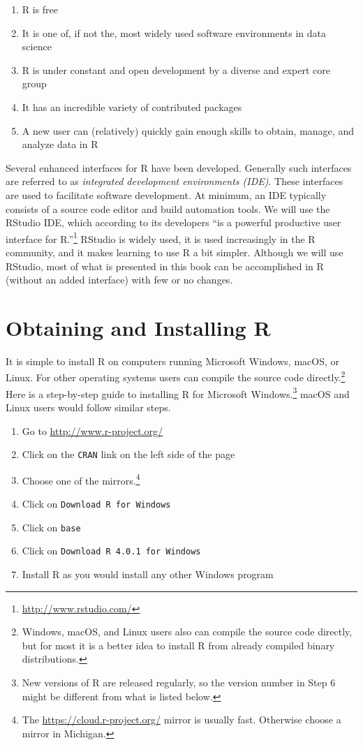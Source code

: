 \documentclass[
]{krantz}
\providecommand{\tightlist}{%
  \setlength{\itemsep}{0pt}\setlength{\parskip}{0pt}}
\begin{document}
\begin{enumerate}
\def\labelenumi{\arabic{enumi}.}
\tightlist
\item
  R is free
\item
  It is one of, if not the, most widely used software environments in data science
\item
  R is under constant and open development by a diverse and expert core group
\item
  It has an incredible variety of contributed packages
\item
  A new user can (relatively) quickly gain enough skills to obtain, manage, and analyze data in R
\end{enumerate}

Several enhanced interfaces for R have been developed. Generally such interfaces are referred to as \emph{integrated development environments (IDE)}. These interfaces are used to facilitate software development. At minimum, an IDE typically consists of a source code editor and build automation tools. We will use the RStudio IDE, which according to its developers ``is a powerful productive user interface for R.''\footnote{\url{http://www.rstudio.com/}} RStudio is widely used, it is used increasingly in the R community, and it makes learning to use R a bit simpler. Although we will use RStudio, most of what is presented in this book can be accomplished in R (without an added interface) with few or no changes.

\hypertarget{obtaining-and-installing-r}{%
\section{Obtaining and Installing R}\label{obtaining-and-installing-r}}

It is simple to install R on computers running Microsoft Windows, macOS, or Linux. For other operating systems users can compile the source code directly.\footnote{Windows, macOS, and Linux users also can compile the source code directly, but for most it is a better idea to install R from already compiled binary distributions.}
Here is a step-by-step guide to installing R for Microsoft Windows.\footnote{New versions of R are released regularly, so the version number in Step 6 might be different from what is listed below.} macOS and Linux users would follow similar steps.

\begin{enumerate}
\def\labelenumi{\arabic{enumi}.}
\tightlist
\item
  Go to \url{http://www.r-project.org/}
\item
  Click on the \texttt{CRAN} link on the left side of the page
\item
  Choose one of the mirrors.\footnote{The \url{https://cloud.r-project.org/} mirror is usually fast. Otherwise choose a mirror in Michigan.}
\item
  Click on \texttt{Download\ R\ for\ Windows}
\item
  Click on \texttt{base}
\item
  Click on \texttt{Download\ R\ 4.0.1\ for\ Windows}
\item
  Install R as you would install any other Windows program
\end{enumerate}
\end{document}
